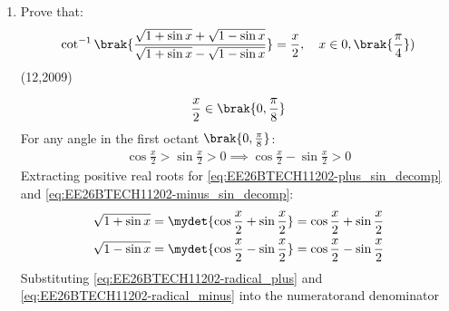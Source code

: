 \begin{enumerate}[label=\thesubsection.\arabic*, ref=\thesubsection.\theenumi]
  \begin{align}
  \frac{\partial F}{\partial x} &= \frac{\partial}{\partial x}\brak{y \ln\brak{\cos x} - x \ln\brak{\sin y}}
  \\
  &= y \cdot \frac{1}{\cos x} \cdot \brak{-\sin x} - \ln\brak{\sin y} \cdot 1
  \\
  &= -y \tan x - \ln\brak{\sin y}
  \label{partial_x_val}
  \end{align}
  \begin{align}
  	\frac{\partial F}{\partial y} &= \frac{\partial}{\partial y}\brak{y \ln\brak{\cos x} - x \ln\brak{\sin y}}
  	\\
  	&= \ln\brak{\cos x} \cdot 1 - x \cdot \frac{1}{\sin y} \cdot \cos y
  	\\
  	&= \ln\brak{\cos x} - x \cot y
  	\label{partial_y_val}
  \end{align}
   From \eqref{ITF2}
   \begin{align}
   	\frac{dy}{dx} &= -\frac{-y \tan x - \ln\brak{\sin y}}{\ln\brak{\cos x} - x \cot y}
   	\\
   	&= \frac{y \tan x + \ln\brak{\sin y}}{\ln\brak{\cos x} - x \cot y}
   \end{align}
  \item   Prove that:
  $$\cot^{-1}\brak{ \frac{\sqrt{1 + \sin x} + \sqrt{1 - \sin x}}{\sqrt{1 + \sin x} - \sqrt{1 - \sin x}} } = \frac{x}{2}, \quad x \in 0, \brak{\frac{\pi}{4}})$$ \hfill{(12,2009)} \\
  \solution
  
  \begin{align}
  	\frac{x}{2} \in \brak{0, \frac{\pi}{8}}
  \end{align}
  For any angle in the first octant $\brak{0, \frac{\pi}{8}}$:
  \begin{align}
  	\cos\frac{x}{2} > \sin\frac{x}{2} > 0 \implies \cos\frac{x}{2} - \sin\frac{x}{2} > 0
  \end{align}
  Extracting positive real roots for \eqref{eq:EE26BTECH11202-plus_sin_decomp} and \eqref{eq:EE26BTECH11202-minus_sin_decomp}:
  \begin{align}
  	\sqrt{1 + \sin x} &= \mydet{\cos\frac{x}{2} + \sin\frac{x}{2}} = \cos\frac{x}{2} + \sin\frac{x}{2}
  	\label{eq:EE26BTECH11202-radical_plus}
  	\\
  	\sqrt{1 - \sin x} &= \mydet{\cos\frac{x}{2} - \sin\frac{x}{2}} = \cos\frac{x}{2} - \sin\frac{x}{2}
  	\label{eq:EE26BTECH11202-radical_minus}
  \end{align}
  Substituting \eqref{eq:EE26BTECH11202-radical_plus} and \eqref{eq:EE26BTECH11202-radical_minus} into the numeratorand denominator
  

\end{enumerate}
